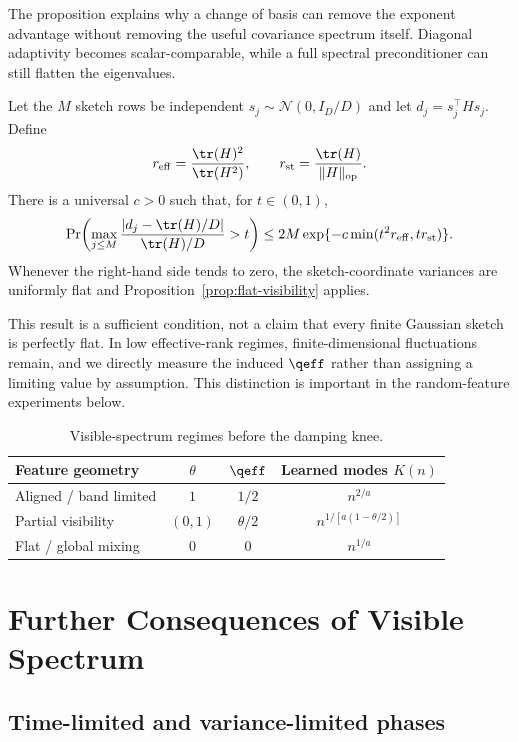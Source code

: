 The proposition explains why a change of basis can remove the exponent advantage without removing the useful covariance spectrum itself.  Diagonal adaptivity becomes scalar-comparable, while a full spectral preconditioner can still flatten the eigenvalues.

\begin{proposition}
\label{prop:gaussian-sketch}
Let the $M$ sketch rows be independent $s_j\sim\mathcal N(0,I_D/D)$ and let $d_j=s_j^\top Hs_j$.  Define
\[
 r_{\rm eff}=\frac{\tr(H)^2}{\tr(H^2)},
 \qquad
 r_{\rm st}=\frac{\tr(H)}{\|H\|_{\rm op}}.
\]
There is a universal $c>0$ such that, for $t\in(0,1)$,
\[
 \Pr\!\left(\max_{j\le M}
 \frac{|d_j-\tr(H)/D|}{\tr(H)/D}>t\right)
 \le2M\exp\{-c\min(t^2r_{\rm eff},t r_{\rm st})\}.
\]
Whenever the right-hand side tends to zero, the sketch-coordinate variances are uniformly flat and Proposition~\ref{prop:flat-visibility} applies.
\end{proposition}

This result is a sufficient condition, not a claim that every finite Gaussian sketch is perfectly flat.  In low effective-rank regimes, finite-dimensional fluctuations remain, and we directly measure the induced $\qeff$ rather than assigning a limiting value by assumption.  This distinction is important in the random-feature experiments below.

\begin{table}[t]
\centering
\small
\caption{Visible-spectrum regimes before the damping knee.}
\label{tab:regimes}
\begin{tabular}{lccc}
\toprule
Feature geometry & $\theta$ & $\qeff$ & Learned modes $K(n)$\\
\midrule
Aligned / band limited & $1$ & $1/2$ & $n^{2/a}$\\
Partial visibility & $(0,1)$ & $\theta/2$ & $n^{1/[a(1-\theta/2)]}$\\
Flat / global mixing & $0$ & $0$ & $n^{1/a}$\\
\bottomrule
\end{tabular}
\end{table}

\section{Further Consequences of Visible Spectrum}

\subsection{Time-limited and variance-limited phases}

